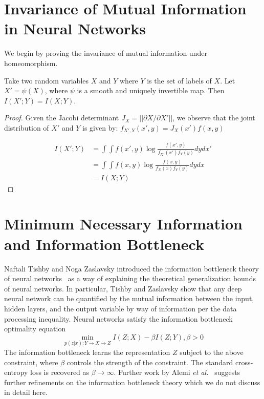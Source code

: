 \section{Invariance of Mutual Information in Neural Networks}\label{invariance}

We begin by proving the invariance of mutual information under homeomorphism.

\begin{theorem}
Take two random variables $X$ and $Y$ where $Y$ is the set of labels of $X$.
Let $X' = \psi(X)$, where $\psi$ is a smooth and uniquely invertible map.
Then $I(X'; Y) = I(X; Y)$.
\end{theorem}

\begin{proof}
Given the Jacobi determinant $J_X = ||\partial X/ \partial X'||$, we observe that the joint distribution of $X'$ and $Y$ is given by: $f_{X', Y}(x', y) = J_X(x')f(x, y)$

\begin{align*}
I(X'; Y) & = \int \int f(x', y) \log \frac{f(x', y)}{f_{X'}(x') f_{Y}(y)} dy dx'\\
& = \int \int f(x, y) \log \frac{f(x, y)}{f_{X}(x) f_{Y}(y)} dy dx \\
& = I(X; Y)
\end{align*}
\end{proof}

\section{Minimum Necessary Information and Information Bottleneck}
Naftali Tishby and Noga Zaslavsky introduced the information bottleneck theory of neural networks~\cite{tishby2015deep} as a way of explaining the theoretical generalization bounds of neural networks.
In particular, Tishby and Zaslavsky show that any deep neural network can be quantified by the mutual information between the input, hidden layers, and the output variable by way of information per the data processing inequality.
Neural networks satisfy the information bottleneck optimality equation
$$\min_{p(z|x):Y \to X \to Z} I(Z;X) - \beta I(Z; Y) , \beta > 0$$
The information bottleneck learns the representation $Z$ subject to the above constraint, where $\beta$ controls the strength of the constraint.
The standard cross-entropy loss is recovered as $\beta \to \infty$. 
Further work by Alemi \textit{et al.}~\cite{alemi2016deep} suggests further refinements on the information bottleneck theory which we do not discuss in detail here. 

